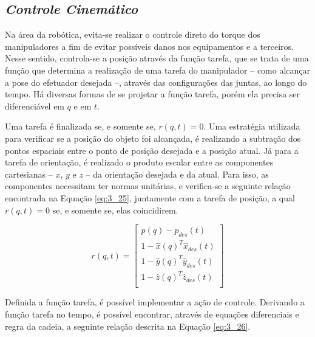  
\subsection{\textit{Controle Cinemático}}\label{sec:Cap3_ControleCin}

Na área da robótica, evita-se realizar o controle direto do torque dos manipuladores a fim de evitar possíveis danos nos equipamentos e a terceiros. Nesse sentido, controla-se a posição através da função tarefa, que se trata de uma função que determina a realização de uma tarefa do manipulador – como alcançar a pose do efetuador desejada –, através das configurações das juntas, ao longo do tempo. Há diversas formas de se projetar a função tarefa, porém ela precisa ser diferenciável em $q$ e em $t$.

Uma tarefa é finalizada se, e somente se, $r(q,t) = 0$. Uma estratégia utilizada para verificar se a posição do objeto foi alcançada, é realizando a subtração dos pontos espaciais entre o ponto de posição desejada e a posição atual. Já para a tarefa de orientação, é realizado o produto escalar entre as componentes cartesianas – $x$, $y$ e $z$ – da orientação desejada e da atual. Para isso, as componentes necessitam ter normas unitárias, e verifica-se a seguinte relação encontrada na Equação \ref{eq:3_25}, juntamente com a tarefa de posição, a qual $r(q,t) = 0$ se, e somente se, elas coincidirem.

\begin{equation}
r(q,t) = 
\begin{bmatrix}
p(q)-p_{des}(t)\\
1-\hat{x}(q)^T\hat{x}_{des}(t)\\
1-\hat{y}(q)^T\hat{y}_{des}(t)\\
1-\hat{z}(q)^T\hat{z}_{des}(t)\\
\end{bmatrix}
\label{eq:3_25}
\end{equation} 


Definida a função tarefa, é possível implementar a ação de controle. Derivando a função tarefa no tempo, é possível encontrar, através de equações diferenciais e regra da cadeia, a seguinte relação descrita na Equação \ref{eq:3_26}.

